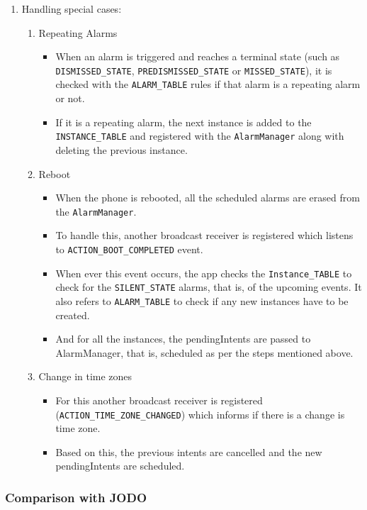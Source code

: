 \documentclass{article}
\begin{document}
\begin{enumerate}
    \item Handling special cases:
    \begin{enumerate}
        \item Repeating Alarms
        \begin{itemize}
            \item When an alarm is triggered and reaches a terminal state (such as \texttt{DISMISSED\_STATE}, \texttt{PREDISMISSED\_STATE} or \texttt{MISSED\_STATE}), it is checked with the \texttt{ALARM\_TABLE} rules if that alarm is a repeating alarm or not. 
            \item If it is a repeating alarm, the next instance is added to the \texttt{INSTANCE\_TABLE} and registered with the \texttt{AlarmManager} along with deleting the previous instance.
        \end{itemize}
        \item Reboot
        \begin{itemize}
            \item When the phone is rebooted, all the scheduled alarms are erased from the \texttt{AlarmManager}.
            \item To handle this, another broadcast receiver is registered which listens to \texttt{ACTION\_BOOT\_COMPLETED} event.
            \item When ever this event occurs, the app checks the \texttt{Instance\_TABLE} to check for the \texttt{SILENT\_STATE} alarms, that is, of the upcoming events. It also refers to \texttt{ALARM\_TABLE} to check if any new instances have to be created.
            \item And for all the instances, the pendingIntents are passed to AlarmManager, that is, scheduled as per the steps mentioned above.
        \end{itemize}
        \item Change in time zones
        \begin{itemize}
            \item For this another broadcast receiver is registered (\texttt{ACTION\_TIME\_ZONE\_CHANGED}) which informs if there is a change is time zone.
            \item Based on this, the previous intents are cancelled and the new pendingIntents are scheduled.
        \end{itemize}
    \end{enumerate}
\end{enumerate}

\subsubsection{Comparison with JODO}
\label{sec: DeskClock_JODO_Comparison}
\end{document}
